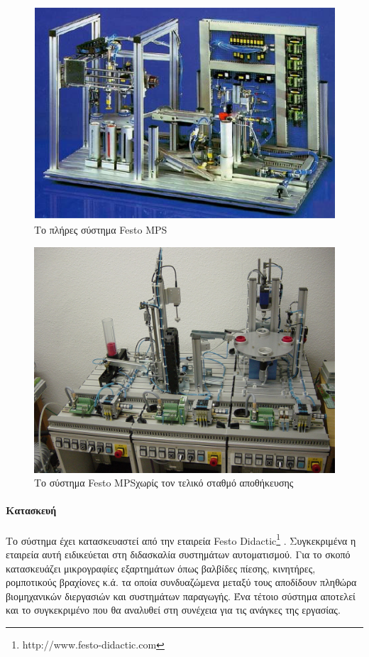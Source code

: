 \documentclass[a4paper,12pt,twoside]{report}
\begin{document}
{			\begin{figure}[hp]
					\centering
					\includegraphics[scale=0.75]{FestoMPSSystem2.png}
					\caption{Το πλήρες σύστημα Festo MPS\textregistered}
					\label{φωτ:Το πλήρες σύστημα Festo MPS}
			\end{figure}
			
			\begin{figure}[hp]
					\centering
					\includegraphics[scale=0.25]{FestoMPSSystem1.png}
					\caption{Το σύστημα Festo MPS\textregistered  χωρίς τον τελικό σταθμό αποθήκευσης \cite{PhotosFestoMPSUniversityHalle}}
					\label{φωτ:Το σύστημα Festo MPS χωρίς τον τελικό σταθμό αποθήκευσης}
			\end{figure}
			
			\paragraph{Κατασκευή} {Το σύστημα έχει κατασκευαστεί από την εταιρεία Festo Didactic\footnote{http://www.festo-didactic.com} . Συγκεκριμένα η εταιρεία αυτή ειδικεύεται στη διδασκαλία συστημάτων αυτοματισμού. Για το σκοπό κατασκευάζει μικρογραφίες εξαρτημάτων όπως βαλβίδες πίεσης, κινητήρες, ρομποτικούς βραχίονες κ.ά. τα οποία συνδυαζώμενα μεταξύ τους αποδίδουν πληθώρα βιομηχανικών διεργασιών και συστημάτων παραγωγής. Ένα τέτοιο σύστημα αποτελεί και το συγκεκριμένο που θα αναλυθεί στη συνέχεια για τις ανάγκες της εργασίας.
			}
			
}
\end{document}
